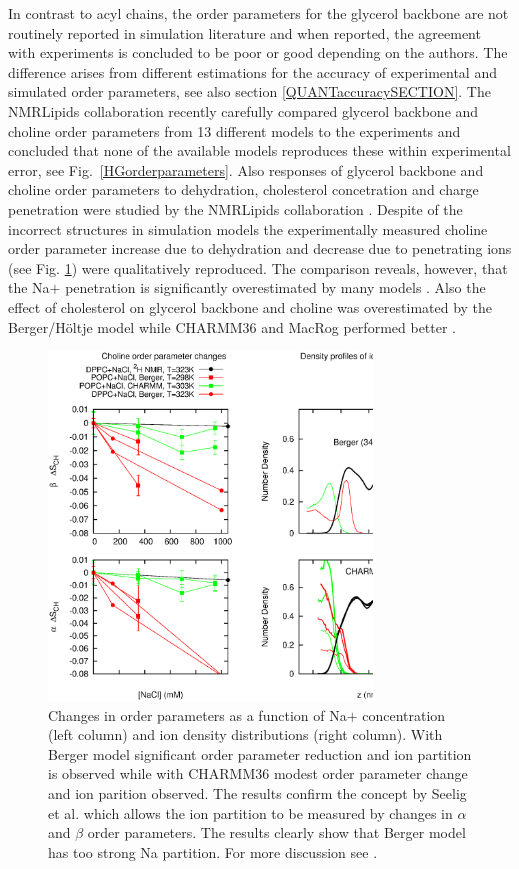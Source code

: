 \documentclass[aps,prl,superscriptaddress,twocolumn]{revtex4}
\begin{document}
In contrast to acyl chains, the order parameters for the glycerol backbone are not routinely
reported in simulation literature and when reported, the agreement with experiments is concluded to
be poor \cite{hogberg06,poger12,botan15} or good \cite{hogberg06,hogberg08,kapla12} depending on the authors.
The difference arises from different estimations for the accuracy of experimental and simulated order parameters,
see also section \ref{QUANTaccuracySECTION}.
The NMRLipids collaboration recently carefully compared glycerol backbone and choline order parameters  
from 13 different models to the experiments and concluded that none of the available models
reproduces these within experimental error, see Fig.~\ref{HGorderparameters}.
Also responses of glycerol backbone and choline order parameters to 
dehydration, cholesterol concetration and charge penetration were 
studied by the NMRLipids collaboration \cite{botan15,ionpaper}.
Despite of the incorrect structures in simulation models the experimentally measured choline order
parameter increase due to dehydration \cite{botan15} and decrease due to penetrating 
ions \cite{ionpaper} (see Fig. \ref{changesDUEna}) were qualitatively reproduced. 
The comparison reveals, however, that the Na$ +$ penetration is significantly
overestimated by many models \cite{ionpaper}. 
Also the effect of cholesterol on glycerol backbone and choline was overestimated
by the Berger/Höltje model while CHARMM36 and MacRog performed better \cite{botan15}. 
\begin{figure}[]
  \includegraphics[width=8.6cm]{../Fig/changesDUEna.eps}
\newline
  \caption{\label{changesDUEna}
    Changes in order parameters as a function of Na$ +$ concentration (left column) and
    ion density distributions (right column). With Berger model significant order parameter
    reduction and ion partition is observed while with CHARMM36 modest order parameter change
    and ion parition observed. The results confirm the concept by Seelig et al. which allows
    the ion partition to be measured by changes in $\alpha$ and $\beta$ order parameters.
    The results clearly show that Berger model has too strong Na partition. 
    For more discussion see \cite{ionpaper}.
  } 
\end{figure}
\end{document}
